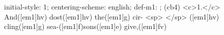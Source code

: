 initial-style: 1;
centering-scheme: english;
def-m1: \grealign;
(cb4) <c>1.</c> And([em1]hv) dost([em1]hv) the([em1]g) cir- <sp> </sp> ([em1]hv) cling([em1]g) sea-([em1]f)sons([em1]e) give,([em1]fv)